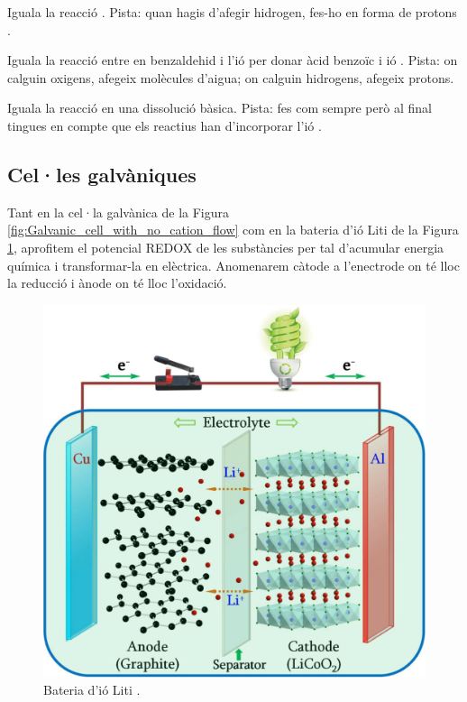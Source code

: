\begin{exr}
Iguala la reacció . Pista: quan hagis d'afegir hidrogen, fes-ho en forma de protons .
\end{exr}

\begin{exr}
Iguala la reacció entre en benzaldehid i l'ió  per donar àcid benzoïc i ió . Pista: on calguin oxigens, afegeix molècules d'aigua; on calguin hidrogens, afegeix protons.
\end{exr}

\begin{exr}
Iguala la reacció  en una dissolució bàsica. Pista: fes com sempre però al final tingues en compte que els reactius han d'incorporar l'ió .
\end{exr}

\subsection{Cel·les galvàniques}

Tant en la cel·la galvànica de la Figura \ref{fig:Galvanic_cell_with_no_cation_flow} com en la bateria d'ió Liti de la Figura \ref{fig:LiIon3}, aprofitem el potencial REDOX de les substàncies per tal d'acumular energia química i transformar-la en elèctrica. 
Anomenarem càtode a l'enectrode on té lloc la reducció i ànode on té lloc l'oxidació.

\begin{figure}[h]
\centering
\includegraphics[scale=1]{figures/LiIon3.png}
\caption{Bateria d'ió Liti \cite{liu_understanding_2016}.}
\label{fig:LiIon3}
\end{figure}

